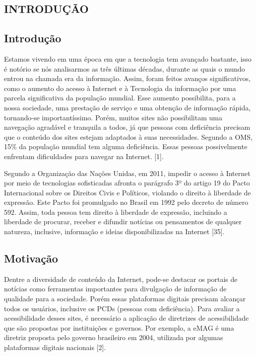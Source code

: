 \documentclass[a4paper]{article}
\begin{document}
\begin{titlepage}
	\begin{center}
		\tableofcontents
	\end{center}
\end{titlepage}

\begin{titlepage}
\section{INTRODUÇÃO}
\fontsize{12pt}{0pt}\selectfont
\onehalfspacing

\subsection{Introdução}

Estamos vivendo em uma época em que a tecnologia tem avançado bastante, isso é notório se nós analisarmos as três últimas décadas, durante as quais o mundo entrou na chamada era da informação. Assim, foram feitos avanços significativos, como o aumento do acesso à Internet e à Tecnologia da informação por uma parcela significativa da população mundial. Esse aumento possibilita, para a nossa sociedade, uma prestação de serviço e uma obtenção de informação rápida, tornando-se importantíssimo. Porém, muitos sites não possibilitam uma navegação agradável e tranquila a todos, já que pessoas com deficiência precisam que o conteúdo dos sites estejam adaptados à suas necessidades. Segundo a OMS, 15\% da população mundial tem alguma deficiência. Essas pessoas possivelmente enfrentam dificuldades para navegar na Internet. [1].

Segundo a Organização das Nações Unidas, em 2011, impedir o acesso à Internet por meio de tecnologias sofisticadas afronta o  parágrafo 3º do artigo 19 do Pacto Internacional sobre os Direitos Civis e Políticos, violando o direito à liberdade de expressão. Este Pacto foi promulgado no Brasil em 1992 pelo decreto de número 592. Assim, toda pessoa tem direito à liberdade de expressão, incluindo a liberdade de procurar, receber e difundir notícias ou pensamentos de qualquer natureza, inclusive, informação e ideias disponibilizadas na Internet [35].

\subsection{Motivação}

Dentre a diversidade de conteúdo da Internet, pode-se destacar os portais de notícias como ferramentas importantes para divulgação de informação de qualidade para a sociedade. Porém essas plataformas digitais precisam alcançar todos os usuários, inclusive os PCDs (pessoas com deficiência). Para avaliar a acessibilidade desses sites, é necessário a aplicação de diretrizes de acessibilidade que são propostas por instituições e governos. Por exemplo, a eMAG é uma diretriz proposta pelo governo brasileiro em 2004, utilizada por algumas plataformas digitais nacionais [2].


\end{titlepage}
\end{document}

